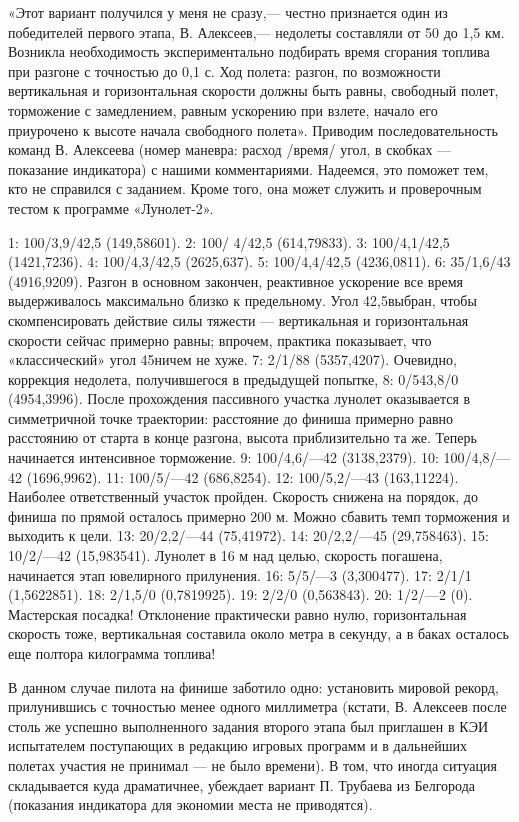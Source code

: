 \documentclass[11pt,a4paper,oneside]{article}
\begin{document}
«Этот вариант получился у меня не сразу,— честно признается один из победителей первого этапа, В. Алексеев,— недолеты составляли от 50 до 1,5 км. Возникла необходимость экспериментально подбирать время сгорания топлива при разгоне с точностью до 0,1 с. Ход полета: разгон, по возможности вертикальная и горизонтальная скорости должны быть равны, свободный полет, торможение с замедлением, равным ускорению при взлете, начало его приурочено к высоте начала свободного полета». Приводим последовательность команд В. Алексеева (номер маневра: расход /время/ угол, в скобках — показание индикатора) с нашими комментариями. Надеемся, это поможет тем, кто не справился с заданием. Кроме того, она может служить и проверочным тестом к программе «Лунолет-2».

1: 100/3,9/42,5 (149,58601). 2: 100/ 4/42,5	(614,79833).	3:	100/4,1/42,5
(1421,7236). 4: 100/4,3/42,5 (2625,637). 5: 100/4,4/42,5 (4236,0811). 6: 35/1,6/43 (4916,9209). Разгон в основном закончен, реактивное ускорение все время выдерживалось максимально близко к предельному. Угол 42,5\degree выбран, чтобы скомпенсировать действие силы тяжести — вертикальная и горизонтальная скорости сейчас примерно равны; впрочем, практика показывает, что «классический» угол 45\degree ничем не хуже. 7: 2/1/88 (5357,4207). Очевидно, коррекция недолета, получившегося в предыдущей попытке, 8: 0/543,8/0 (4954,3996). После прохождения пассивного участка лунолет оказывается в симметричной точке траектории: расстояние до финиша примерно равно расстоянию от старта в конце разгона, высота приблизительно та же. Теперь начинается интенсивное торможение. 9:	100/4,6/—42 (3138,2379). 10: 100/4,8/—42 (1696,9962). 11: 100/5/—42 (686,8254). 12: 100/5,2/—43 (163,11224). Наиболее ответственный участок пройден. Скорость снижена на порядок, до финиша по прямой осталось примерно 200 м. Можно сбавить темп торможения и выходить к цели. 13: 20/2,2/—44 (75,41972). 14: 20/2,2/—45 (29,758463). 15: 10/2/—42 (15,983541). Лунолет в 16 м над целью, скорость погашена, начинается этап ювелирного прилунения. 16:	5/5/—3	(3,300477).	17:	2/1/1 (1,5622851). 18: 2/1,5/0 (0,7819925). 19: 2/2/0 (0,563843). 20: 1/2/—2 (0). Мастерская посадка! Отклонение практически равно нулю, горизонтальная скорость тоже, вертикальная составила около метра в секунду, а в баках осталось еще полтора килограмма топлива!

В данном случае пилота на финише заботило одно: установить мировой рекорд, прилунившись с точностью менее одного миллиметра (кстати, В. Алексеев после столь же успешно выполненного задания второго этапа был приглашен в КЭИ испытателем поступающих в редакцию игровых программ и в дальнейших полетах участия не принимал — не было времени). В том, что иногда ситуация складывается куда драматичнее, убеждает вариант П. Трубаева из Белгорода (показания индикатора для экономии места не приводятся).
\end{document}
